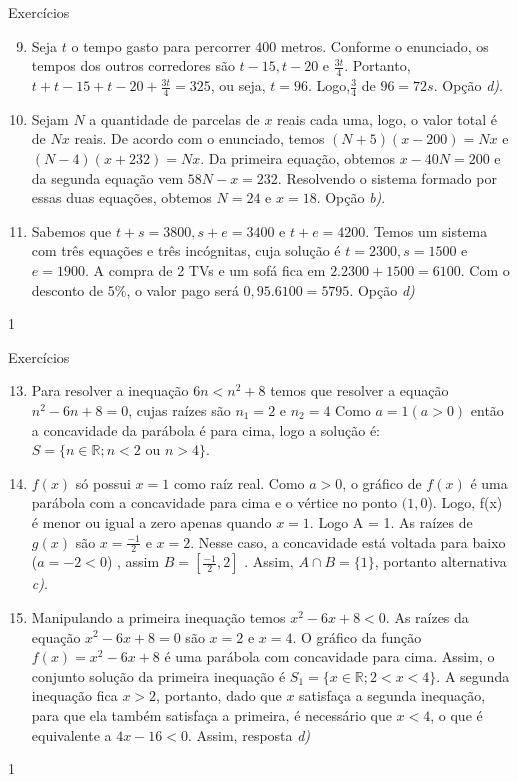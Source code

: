 \begin{answer}{Exercícios}
{\exerciselist
\begin{enumerate}\setcounter{enumi}{8}
\item Seja $t$ o tempo gasto para percorrer $400$ metros. Conforme o enunciado, os tempos dos outros corredores são $t-15, t-20$ e $\frac{3t}{4}$.
Portanto, $t+t-15 + t-20 + \frac{3t}{4} = 325$, ou seja, $t=96$. Logo,$\frac{3}{4} $ de $96 = 72s$. Opção \textit{d)}.

\item Sejam $N$ a quantidade de parcelas de $x$ reais cada uma, logo, o valor total é de $Nx$ reais. De acordo com o enunciado, temos $(N+5)(x-200)=Nx$ e $(N-4)(x+232)=Nx$. Da primeira equação, obtemos $x-40N=200$ e da segunda equação vem $58N-x=232$. Resolvendo o sistema formado por essas duas equações, obtemos $N=24$ e $x=18$. Opção \textit{b)}. 

\item Sabemos que $t+s=3800, s+e=3400$ e $t+e=4200$. Temos um sistema com três equações e três incógnitas, cuja solução é $t=2300, s=1500$ e $e=1900$. A compra de 2 TVs e um sofá fica em $2.2300+1500=6100$. Com o desconto de $5\%$, o valor pago será $0,95.6100=5795$. Opção \textit{d)}
\end{enumerate}
}{1}
\end{answer}
\clearmargin

\begin{answer}{Exercícios}
{\exerciselist
\begin{enumerate}\setcounter{enumi}{12}
\item Para resolver a inequação  $6n < n^2+ 8$  temos que resolver a equação $n^2-6n+8=0$, cujas raízes são $n_1=2$ e $n_2=4$
Como $a=1 (a>0)$ então a concavidade da parábola é para cima, logo a solução é: $S=\{n\in \mathbb{R}; n<2 \mbox{ ou } n>4\}$.

\item $f(x)$ só possui $x=1$ como raíz real. Como $a>0$, o gráfico  de $f(x)$ é uma parábola com a concavidade para cima e o vértice no ponto $(1,0$).
Logo, f(x) é menor ou igual a zero apenas quando $x=1$.
Logo A = {1}. As raízes de $g(x)$ são $x=\frac{-1}{2}$ e $x=2$. Nesse caso, a concavidade está voltada para baixo ($a=-2<0$)
, assim $B= \left[\frac{-1}{2},2\right]$ . Assim, $A\cap B=\{1\}$, portanto alternativa \textit{c)}.

\item Manipulando a primeira inequação temos  $x^2-6x+8<0$. As raízes da equação $x^2-6x+8=0$ são $x=2$ e $x=4$. 
O gráfico da função $f(x)=x^2-6x+8$ é uma parábola com concavidade para cima. Assim, o conjunto solução da primeira inequação é $S_1=\{x\in \mathbb{R};2<x<4\}.$ A segunda inequação fica $x>2$, portanto, dado que $x$ satisfaça a segunda inequação, para que ela também satisfaça a primeira, é necessário que $x<4$, o que é equivalente a $4x-16<0$. Assim, resposta \textit{d)}
\end{enumerate}
}{1}
\end{answer}
\clearmargin

